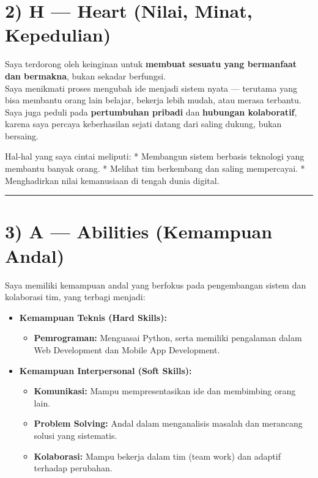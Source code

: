 \documentclass[
  letterpaper,
  DIV=11,
  numbers=noendperiod]{scrreprt}
\providecommand{\tightlist}{%
  \setlength{\itemsep}{0pt}\setlength{\parskip}{0pt}}
\begin{document}
\section{2) H --- Heart (Nilai, Minat,
Kepedulian)}\label{h-heart-nilai-minat-kepedulian}

Saya terdorong oleh keinginan untuk \textbf{membuat sesuatu yang
bermanfaat dan bermakna}, bukan sekadar berfungsi.\\
Saya menikmati proses mengubah ide menjadi sistem nyata --- terutama
yang bisa membantu orang lain belajar, bekerja lebih mudah, atau merasa
terbantu.\\
Saya juga peduli pada \textbf{pertumbuhan pribadi} dan \textbf{hubungan
kolaboratif}, karena saya percaya keberhasilan sejati datang dari saling
dukung, bukan bersaing.

Hal-hal yang saya cintai meliputi: * Membangun sistem berbasis teknologi
yang membantu banyak orang. * Melihat tim berkembang dan saling
mempercayai. * Menghadirkan nilai kemanusiaan di tengah dunia digital.

\begin{center}\rule{0.5\linewidth}{0.5pt}\end{center}

\section{3) A --- Abilities (Kemampuan
Andal)}\label{a-abilities-kemampuan-andal}

Saya memiliki kemampuan andal yang berfokus pada pengembangan sistem dan
kolaborasi tim, yang terbagi menjadi:

\begin{itemize}
\tightlist
\item
  \textbf{Kemampuan Teknis (Hard Skills):}

  \begin{itemize}
  \tightlist
  \item
    \textbf{Pemrograman:} Menguasai Python, serta memiliki pengalaman
    dalam Web Development dan Mobile App Development.
  \end{itemize}
\item
  \textbf{Kemampuan Interpersonal (Soft Skills):}

  \begin{itemize}
  \tightlist
  \item
    \textbf{Komunikasi:} Mampu mempresentasikan ide dan membimbing orang
    lain.
  \item
    \textbf{Problem Solving:} Andal dalam menganalisis masalah dan
    merancang solusi yang sistematis.
  \item
    \textbf{Kolaborasi:} Mampu bekerja dalam tim (team work) dan adaptif
    terhadap perubahan.
  \end{itemize}
\end{itemize}
\end{document}
